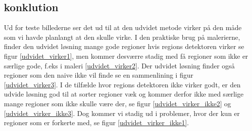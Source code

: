 \subsection{konklution}
Ud for teste billederne ser det ud til at den udvidet metode virker på
den måde som vi havde planlangt at den skulle virke. I den praktiske
brug på malerierne, finder den udvidet løsning mange gode regioner hvis
regions detektoren virker se figur \ref{udvidet_virker1}, men kommer
desværre stadig med få regioner som ikke er særlige gode, f.eks i maleri
\ref{udvidet_virker2}. Der udvidet løsning finder også regioner som den
naive ikke vil finde se en sammenlining i figur \ref{udvidet_virker3}. I
de tilfælde hvor regions detektoren ikke virker godt, er den udvide
løsning god til at sorter regioner væk og kommer derfor ikke med særlige
mange regioner som ikke skulle være der, se figur
\ref{udvidet_virker_ikke2} og \ref{udvidet_virker_ikke3}. Dog kommer vi
stadig ud i problemer, hvor der kun er regioner som er forkerte med,
se figur \ref{udvidet_virker_ikke1}.
